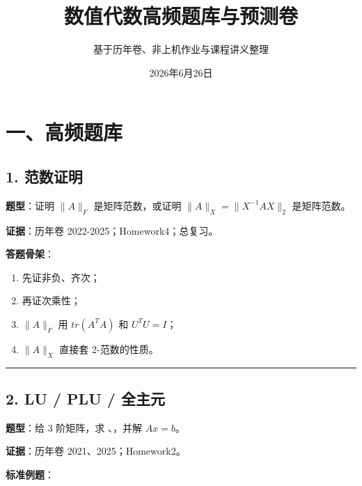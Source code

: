 \documentclass[11pt,a4paper]{ctexart}
\title{\bfseries 数值代数高频题库与预测卷}
\author{基于历年卷、非上机作业与课程讲义整理}
\date{2026年6月26日}
\newcommand{\code}[1]{\begingroup\ttfamily\small #1\endgroup}
\begin{document}
\maketitle
\tableofcontents
\newpage


\section*{一、高频题库}



\subsection*{1. 范数证明}


\textbf{题型}：证明 $\|A\|_F$ 是矩阵范数，或证明 $\|A\|_X=\|X^{-1}AX\|_2$ 是矩阵范数。

\textbf{证据}：历年卷 2022-2025；Homework4；总复习。

\textbf{答题骨架}：

\begin{enumerate}

\item 先证非负、齐次；

\item 再证次乘性；

\item $\|A\|_F$ 用 $tr(A^TA)$ 和 $U^TU=I$；

\item $\|A\|_X$ 直接套 2-范数的性质。

\end{enumerate}

\bigskip\hrule\bigskip


\subsection*{2. LU / PLU / 全主元}


\textbf{题型}：给 3 阶矩阵，求 \code{}、\code{}，并解 $Ax=b$。

\textbf{证据}：历年卷 2021、2025；Homework2。

\textbf{标准例题}：
\end{document}
